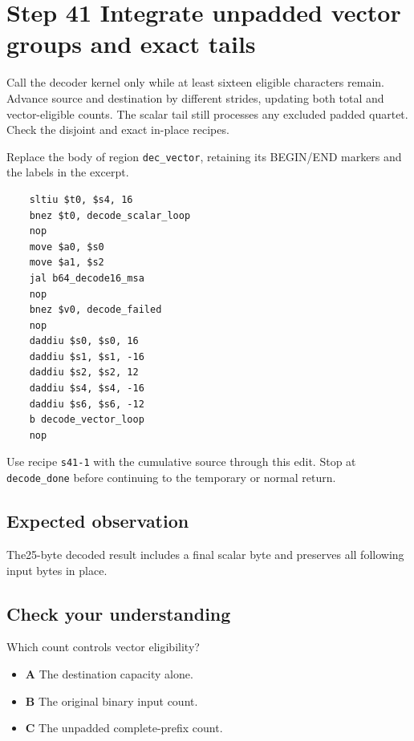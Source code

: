 \section{Step 41 Integrate unpadded vector groups and exact tails}\label{base64-s41}

Call the decoder kernel only while at least sixteen eligible characters remain. Advance source and destination by different strides, updating both total and vector-eligible counts. The scalar tail still processes any excluded padded quartet. Check the disjoint and exact in-place recipes.

Replace the body of region \texttt{dec\_vector}, retaining its BEGIN/END markers and the labels in the excerpt.

\begin{verbatim}
    sltiu $t0, $s4, 16
    bnez $t0, decode_scalar_loop
    nop
    move $a0, $s0
    move $a1, $s2
    jal b64_decode16_msa
    nop
    bnez $v0, decode_failed
    nop
    daddiu $s0, $s0, 16
    daddiu $s1, $s1, -16
    daddiu $s2, $s2, 12
    daddiu $s4, $s4, -16
    daddiu $s6, $s6, -12
    b decode_vector_loop
    nop
\end{verbatim}

Use recipe \texttt{s41-1} with the cumulative source through this edit. Stop at \texttt{decode\_done} before continuing to the temporary or normal return.

\subsection{Expected observation}
The25-byte decoded result includes a final scalar byte and preserves all following input bytes in place.

\subsection{Check your understanding}
Which count controls vector eligibility?

\begin{itemize}
\item \textbf{A} The destination capacity alone.
\item \textbf{B} The original binary input count.
\item \textbf{C} The unpadded complete-prefix count.
\end{itemize}
